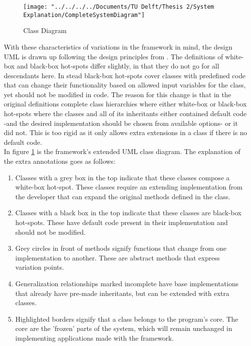 \begin{figure}
	\centering
	\texttt{[image: "../../../../Documents/TU Delft/Thesis 2/System Explanation/CompleteSystemDiagram"]}
	\caption[Complete System Class Diagram]{Class Diagram}
	\label{fig:completesystemdiagram}
\end{figure}

With these characteristics of variations in the framework in mind, the design UML is drawn up following the design principles from \citet{bouassida2001uml}. The definitions of white-box and black-box hot-spots differ slightly, in that they do not go for all descendants here. In stead black-box hot-spots cover classes with predefined code that can change their functionality based on allowed input variables for the class, yet should not be modified in code. The reason for this change is that in the original definitions complete class hierarchies where either white-box or black-box hot-spots where the classes and all of its inheritants either contained default code -and the desired implementation should be chosen from available options- or it did not. This is too rigid as it only allows extra extensions in a class if there is no default code.\\

In figure \ref{fig:completesystemdiagram} is the framework's extended UML class diagram. The explanation of the extra annotations goes as follows:

\begin{enumerate}
	\item Classes with a grey box in the top indicate that these classes  compose a white-box hot-spot. These classes require an extending implementation from the developer that can expand the original methods defined in the class.
	\item Classes with a black box in the top indicate that these classes are black-box hot-spots. These have default code present in their implementation and should not be modified.
	\item Grey circles in front of methods signify functions that change from one implementation to another. These are abstract methods that express variation points.
	\item Generalization relationships marked {incomplete} have base implementations that already have pre-made inheritants, but can be extended with extra classes.
	\item Highlighted borders signify that a class belongs to the program's core. The core are the 'frozen' parts of the system, which will remain unchanged in implementing applications made with the framework.
\end{enumerate}


